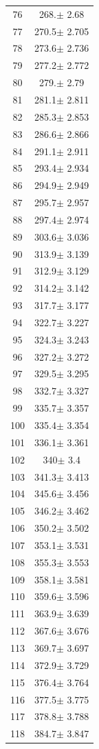 \documentclass[a4paper]{instrumentacao}
\begin{document}
\begin{longtable}{cc}
 76 & 268.$\pm$ 2.68 \\
 77 & 270.5$\pm$ 2.705 \\
 78 & 273.6$\pm$ 2.736 \\
 79 & 277.2$\pm$ 2.772 \\
 80 & 279.$\pm$ 2.79 \\
 81 & 281.1$\pm$ 2.811 \\
 82 & 285.3$\pm$ 2.853 \\
 83 & 286.6$\pm$ 2.866 \\
 84 & 291.1$\pm$ 2.911 \\
 85 & 293.4$\pm$ 2.934 \\
 86 & 294.9$\pm$ 2.949 \\
 87 & 295.7$\pm$ 2.957 \\
 88 & 297.4$\pm$ 2.974 \\
 89 & 303.6$\pm$ 3.036 \\
 90 & 313.9$\pm$ 3.139 \\
 91 & 312.9$\pm$ 3.129 \\
 92 & 314.2$\pm$ 3.142 \\
 93 & 317.7$\pm$ 3.177 \\
 94 & 322.7$\pm$ 3.227 \\
 95 & 324.3$\pm$ 3.243 \\
 96 & 327.2$\pm$ 3.272 \\
 97 & 329.5$\pm$ 3.295 \\
 98 & 332.7$\pm$ 3.327 \\
 99 & 335.7$\pm$ 3.357 \\
 100 & 335.4$\pm$ 3.354 \\
 101 & 336.1$\pm$ 3.361 \\
 102 & 340$\pm$ 3.4 \\
 103 & 341.3$\pm$ 3.413 \\
 104 & 345.6$\pm$ 3.456 \\
 105 & 346.2$\pm$ 3.462 \\
 106 & 350.2$\pm$ 3.502 \\
 107 & 353.1$\pm$ 3.531 \\
 108 & 355.3$\pm$ 3.553 \\
 109 & 358.1$\pm$ 3.581 \\
 110 & 359.6$\pm$ 3.596 \\
 111 & 363.9$\pm$ 3.639 \\
 112 & 367.6$\pm$ 3.676 \\
 113 & 369.7$\pm$ 3.697 \\
 114 & 372.9$\pm$ 3.729 \\
 115 & 376.4$\pm$ 3.764 \\
 116 & 377.5$\pm$ 3.775 \\
 117 & 378.8$\pm$ 3.788 \\
 118 & 384.7$\pm$ 3.847 \\
\end{longtable}
\end{document}
